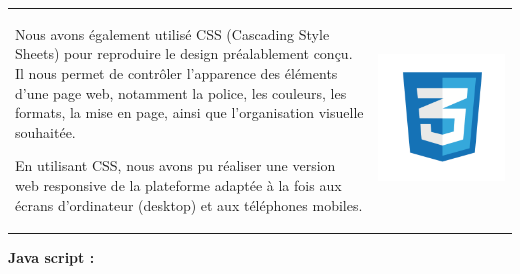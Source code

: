 \documentclass{article}
\begin{document}
\noindent
\begin{tabular}
{@{}m{}@{\hspace{1em}}m{}@{}}
Nous avons également utilisé CSS (Cascading Style Sheets) pour reproduire le design préalablement conçu. Il nous permet de contrôler l’apparence des éléments d’une page web, notamment la police, les couleurs, les formats, la mise en page, ainsi que l’organisation visuelle souhaitée.


En utilisant CSS, nous avons pu réaliser une version web responsive de la plateforme adaptée à la fois aux écrans d’ordinateur (desktop) et aux téléphones mobiles.
&
\includegraphics[width=\linewidth]{css.png} %
\end{tabular}


\vspace{0,3cm}


\noindent \normalsize \textbf{Java script :}

\vspace{0,1cm}
\end{document}
